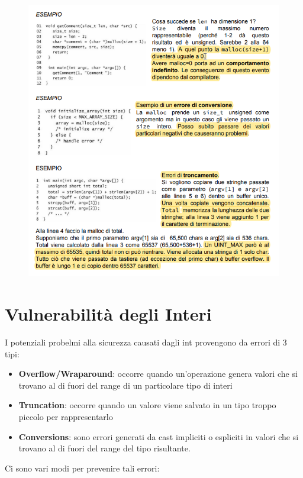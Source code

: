 \begin{figure}[H]
    \centering
    \includegraphics[width=12cm, keepaspectratio]{capitoli/secure_coding/img/cap_2/esempi.png}
\end{figure}

\section{Vulnerabilità degli Interi}

I potenziali probelmi alla sicurezza causati dagli int provengono da errori di 3 tipi:

\begin{itemize}
    \item \textbf{Overflow/Wraparound}: occorre quando un'operazione genera valori
          che si trovano al di fuori del range di un particolare tipo di interi
    \item \textbf{Truncation}: occorre quando un valore viene salvato in un tipo
          troppo piccolo per rappresentarlo
    \item \textbf{Conversions}: sono errori generati da cast impliciti o espliciti
          in valori che si trovano al di fuori del range del tipo risultante.
\end{itemize}

Ci sono vari modi per prevenire tali errori:

